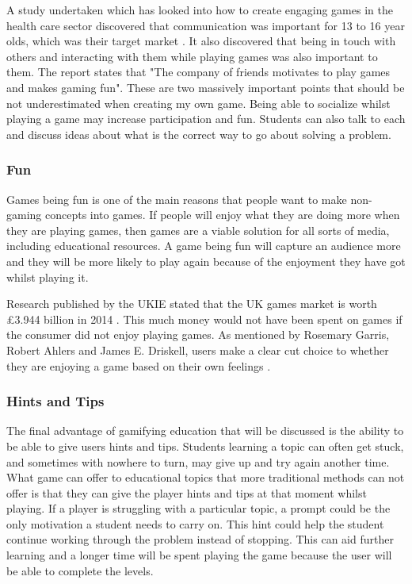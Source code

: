 \documentclass[a4paper]{article}
\begin{document}
A study undertaken which has looked into how to create engaging games in the health care sector discovered that communication was important for 13 to 16 year olds, which was their target market \cite{Suhonen:2008:SFE}. It also discovered that being in touch with others and interacting with them while playing games was also important to them. The report states that "The company of friends motivates to play games and makes gaming fun". These are two massively important points that should be not underestimated when creating my own game. Being able to socialize whilst playing a game may increase participation and fun. Students can also talk to each and discuss ideas about what is the correct way to go about solving a problem. 

\subsubsection{Fun}
Games being fun is one of the main reasons that people want to make non-gaming concepts into games. If people will enjoy what they are doing more when they are playing games, then games are a viable solution for all sorts of media, including educational resources. A game being fun will capture an audience more and they will be more likely to play again because of the enjoyment they have got whilst playing it.

Research published by the UKIE stated that the UK games market is worth £3.944 billion in 2014 \cite{gamesresearch}. This much money would not have been spent on games if the consumer did not enjoy playing games. As mentioned by Rosemary Garris, Robert Ahlers and James E. Driskell, users make a clear cut choice to whether they are enjoying a game based on their own feelings  \cite{garris2002games}. 

\subsubsection{Hints and Tips}
The final advantage of gamifying education that will be discussed is the ability to be able to give users hints and tips. Students learning a topic can often get stuck, and sometimes with nowhere to turn, may give up and try again another time. What game can offer to educational topics that more traditional methods can not offer is that they can give the player hints and tips at that moment whilst playing. If a player is struggling with a particular topic, a prompt could be the only motivation a student needs to carry on. This hint could help the student continue working through the problem instead of stopping. This can aid further learning and a longer time will be spent playing the game because the user will be able to complete the levels. 
\end{document}
